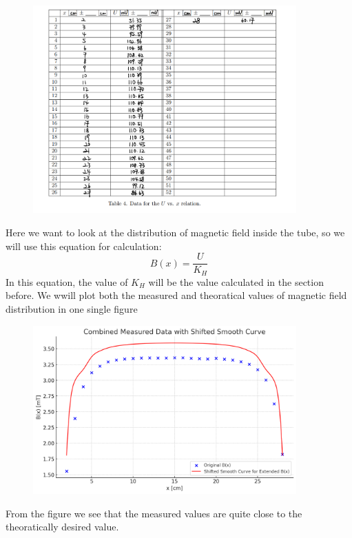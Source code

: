 \documentclass[12pt, a4paper, oneside]{article}
\begin{document}
\begin{figure}[htbp]
	\centering
	\includegraphics[width=0.9\textwidth]{F3.png}
	\label{fig4}
\end{figure}

Here we want to look at the distribution of magnetic field inside the tube, so we will use this equation for calculation:
\begin{equation}
	B(x)=\frac{U}{K_H}
\end{equation}
In this equation, the value of $K_H$ will be the value calculated in the section before. We wwill plot both the measured and theoratical values 
of magnetic field distribution in one single figure
\begin{figure}[htbp]
	\centering
	\includegraphics[width=0.9\textwidth]{F5.png}
	\label{fig5}
\end{figure}
From the figure we see that the measured values are quite close to the theoratically desired value. 
\end{document}
